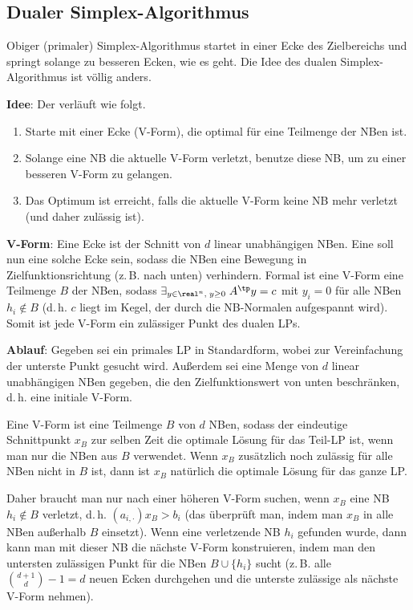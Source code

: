 \pagebreak

\subsection{%
    Dualer Simplex-Algorithmus%
}

Obiger (primaler) Simplex-Algorithmus startet in einer Ecke des Zielbereichs und springt solange
zu besseren Ecken, wie es geht.
Die Idee des dualen Simplex-Algorithmus ist völlig anders.

\textbf{Idee}:
Der  verläuft wie folgt.
\begin{enumerate}
    \item
    Starte mit einer Ecke (V-Form), die optimal für eine Teilmenge der NBen ist.

    \item
    Solange eine NB die aktuelle V-Form verletzt, benutze diese NB, um zu einer besseren V-Form
    zu gelangen.

    \item
    Das Optimum ist erreicht, falls die aktuelle V-Form keine NB mehr verletzt
    (und daher zulässig ist).
\end{enumerate}

\textbf{V-Form}:
Eine Ecke ist der Schnitt von $d$ linear unabhängigen NBen.
Eine  soll nun eine solche Ecke sein, sodass die NBen eine Bewegung in
Zielfunktionsrichtung (z.\,B. nach unten) verhindern.
Formal ist eine V-Form eine Teilmenge $B$ der NBen,
sodass $\exists_{y \in \real^n,\; y \ge 0}\; A^\tp y = c$
mit $y_i = 0$ für alle NBen $h_i \notin B$
(d.\,h. $c$ liegt im Kegel, der durch die NB-Normalen aufgespannt wird).
Somit ist jede V-Form ein zulässiger Punkt des dualen LPs.

\linie

\textbf{Ablauf}:
Gegeben sei ein primales LP in Standardform, wobei zur Vereinfachung der unterste Punkt gesucht
wird.
Außerdem sei eine Menge von $d$ linear unabhängigen NBen gegeben, die den Zielfunktionswert von
unten beschränken, d.\,h. eine initiale V-Form.

Eine V-Form ist eine Teilmenge $B$ von $d$ NBen, sodass der eindeutige Schnittpunkt $x_B$ zur
selben Zeit die optimale Lösung für das Teil-LP ist, wenn man nur die NBen aus $B$ verwendet.
Wenn $x_B$ zusätzlich noch zulässig für alle NBen nicht in $B$ ist, dann ist $x_B$ natürlich die
optimale Lösung für das ganze LP.

Daher braucht man nur nach einer höheren V-Form suchen, wenn $x_B$ eine NB $h_i \notin B$
verletzt, d.\,h. $(a_{i,\cdot}) x_B > b_i$
(das überprüft man, indem man $x_B$ in alle NBen außerhalb $B$ einsetzt).
Wenn eine verletzende NB $h_i$ gefunden wurde, dann kann man mit dieser NB die nächste V-Form
konstruieren, indem man den untersten zulässigen Punkt für die NBen $B \cup \{h_i\}$ sucht
(z.\,B. alle $\binom{d+1}{d} - 1 = d$ neuen Ecken durchgehen und
die unterste zulässige als nächste V-Form nehmen).

